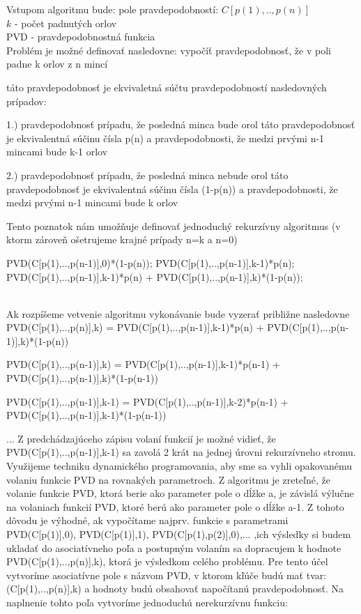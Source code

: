 \documentclass[paper=a4, fontsize=11pt]{scrartcl} %
\numberwithin{equation}{section} %
\numberwithin{figure}{section} %
\numberwithin{table}{section} %
\begin{document}
Vstupom algoritmu bude:
pole pravdepodobností: $C[p(1),..,p(n)]$\\
$k$ - počet padnutých orlov\\
PVD - pravdepodobnostná funkcia\\

Problém je možné definovať nasledovne: 
vypočíť pravdepodobnosť, že v poli padne k orlov z n mincí

táto pravdepodobnosť je ekvivaletná súčtu pravdepodobností nasledovných prípadov:

1.) pravdepodobnosť prípadu, že posledná minca bude orol
táto pravdepodobnosť je ekvivalentná súčinu čísla p(n) a pravdepodobnosti, že medzi prvými n-1 mincami bude k-1 orlov

2.) pravdepodobnosť prípadu, že posledná minca nebude orol
táto pravdepodobnosť je ekvivalentná súčinu čísla (1-p(n)) a pravdepodobnosti, že medzi prvými n-1 mincami bude k orlov

Tento poznatok nám umožňuje definovať jednoduchý rekurzívny algoritmus (v ktorm zároveň ošetrujeme krajné prípady n=k a n=0)

\begin{algorithmic}[1]
            \State \Return PVD(C[p(1),..,p(n-1)],0)*(1-p(n));
        \EndIf
            \State \Return PVD(C[p(1),..,p(n-1)],k-1)*p(n);
        \EndIf
        \State \Return PVD(C[p(1),..,p(n-1)],k-1)*p(n) + PVD(C[p(1),..,p(n-1)],k)*(1-p(n));
    \EndFunction
\end{algorithmic}
\ \\

Ak rozpíšeme vetvenie algoritmu vykonávanie bude vyzerať približne nasledovne
PVD(C[p(1),..,p(n)],k) = PVD(C[p(1),..,p(n-1)],k-1)*p(n) + PVD(C[p(1),..,p(n-1)],k)*(1-p(n))

PVD(C[p(1),..,p(n-1)],k) = PVD(C[p(1),..,p(n-1)],k-1)*p(n-1) + PVD(C[p(1),..,p(n-1)],k)*(1-p(n-1))

PVD(C[p(1),..,p(n-1)],k-1) = PVD(C[p(1),..,p(n-1)],k-2)*p(n-1) + PVD(C[p(1),..,p(n-1)],k-1)*(1-p(n-1))

...
Z predchádzajúceho zápisu volaní funkcií je možné vidieť, že PVD(C[p(1),..,p(n-1)],k-1) sa zavolá 2 krát na jednej úrovni rekurzívneho stromu.
Využijeme techniku dynamického programovania, aby sme sa vyhli opakovanému volaniu funkcie PVD na rovnakých parametroch.
Z algoritmu je zreteľné, že volanie funkcie PVD, ktorá berie ako parameter pole o dĺžke a, je závislá výlučne na volaniach funkcií PVD, ktoré berú ako parameter pole o dĺžke a-1.
Z tohoto dôvodu je výhodné, ak vypočítame najprv. funkcie s parametrami PVD(C[p(1)],0), PVD(C[p(1)],1), PVD(C[p(1),p(2)],0),... ,ich výsledky si budem ukladať do asociatívneho poľa a postupným volaním sa dopracujem k hodnote PVD(C[p(1),..,p(n)],k), ktorá je výsledkom celého problému.
Pre tento účel vytvoríme asociatívne pole s názvom PVD, v ktorom kľúče budú mať tvar:
(C[p(1),..,p(n)],k)
a hodnoty budú obsahovať napočítanú pravdepodobnosť.
Na naplnenie tohto poľa vytvoríme jednoduchú nerekurzívnu funkciu:
\end{document}
